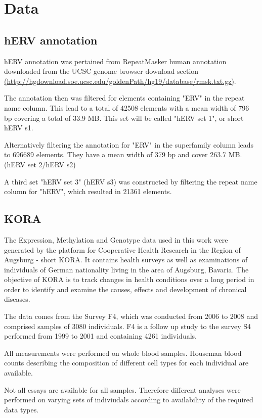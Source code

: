 \documentclass[a4paper,12pt]{article}
\begin{document}
\newpage
\section{Data}


\subsection{hERV annotation}
hERV annotation was pertained from RepeatMasker human annotation downloaded from the UCSC genome browser download section \url{(http://hgdownload.soe.ucsc.edu/goldenPath/hg19/database/rmsk.txt.gz)}.
 
The annotation then was filtered for elements containing "ERV" in the repeat name column. This lead to a total of 42508 elements with a mean width of 796 bp covering a total of 33.9 MB. This set will be called "hERV set 1", or short hERV s1.

Alternatively filtering the annotation for "ERV" in the superfamily column leads to 696689 elements. They have a mean width of 379 bp and cover 263.7 MB. (hERV set 2/hERV s2)

A third set "hERV set 3" (hERV s3) was constructed by filtering the repeat name column for "hERV", which resulted in 21361 elements. 

\subsection{KORA}
The Expression, Methylation and Genotype data used in this work were generated by the platform for Cooperative Health Research in the Region of Augsburg - short KORA. It contains health surveys as well as examinations of individuals of German nationality living in the area of Augsburg, Bavaria.
The objective of KORA is to track changes in health conditions over a long period in order to identify and examine the causes, effects and development of chronical diseases.

The data comes from the Survey F4, which was conducted from 2006 to 2008 and comprised samples of 3080 individuals. F4 is a follow up study to the survey S4 performed from 1999 to 2001 and containing 4261 individuals. 

All measurements were performed on whole blood samples. Houseman blood counts\cite{} describing the composition of different cell types for each individual are available.

Not all essays are available for all samples. Therefore different analyses were performed on varying sets of indiviudals according to availability of the required data types.
\end{document}
